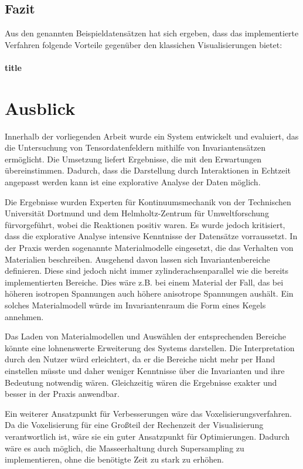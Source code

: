 \documentclass[a4paper,fontsize=12pt,toc=bib,halfparskip]{scrartcl}
\begin{document}
\subsection{Fazit}
Aus den genannten Beispieldatens\"atzen hat sich ergeben, dass das implementierte Verfahren folgende Vorteile gegen\"uber den klassichen Visualisierungen bietet:

\paragraph{title}



\section{Ausblick}
\label{sec:Ausblick}
Innerhalb der vorliegenden Arbeit wurde ein System entwickelt und evaluiert, das die Untersuchung von Tensordatenfeldern mithilfe von Invariantens\"atzen erm\"oglicht. Die Umsetzung liefert Ergebnisse, die mit den Erwartungen \"ubereinstimmen. Dadurch, dass die Darstellung durch Interaktionen in Echtzeit angepasst werden kann ist eine explorative Analyse der Daten m\"oglich. 

Die Ergebnisse wurden Experten f\"ur Kontinuumsmechanik von der Technischen Universit\"at Dortmund und dem Helmholtz-Zentrum für Umweltforschung f\"urvorgef\"uhrt, wobei die Reaktionen positiv waren. Es wurde jedoch kritisiert, dass die explorative Analyse intensive Kenntnisse der Datens\"atze vorraussetzt. In der Praxis werden sogenannte Materialmodelle eingesetzt, die das Verhalten von Materialien beschreiben. Ausgehend davon lassen sich Invariantenbereiche definieren. Diese sind jedoch nicht immer zylinderachsenparallel wie die bereits implementierten Bereiche. Dies w\"are z.B. bei einem Material der Fall, das bei h\"oheren isotropen Spannungen auch h\"ohere anisotrope Spannungen aush\"alt. Ein solches Materialmodell w\"urde im Invariantenraum die Form eines Kegels annehmen. 

Das Laden von Materialmodellen und Ausw\"ahlen der entsprechenden Bereiche k\"onnte eine lohnenswerte Erweiterung des Systems darstellen. Die Interpretation durch den Nutzer w\"urd erleichtert, da er die Bereiche nicht mehr per Hand einstellen m\"usste und daher weniger Kenntnisse \"uber die Invarianten und ihre Bedeutung notwendig w\"aren. Gleichzeitig w\"aren die Ergebnisse exakter und besser in der Praxis anwendbar. 

Ein weiterer Ansatzpunkt f\"ur Verbesserungen w\"are das Voxelisierungsverfahren. Da die Voxelisierung f\"ur eine Gro{\ss}teil der Rechenzeit der Visualisierung verantwortlich ist, w\"are sie ein guter Ansatzpunkt f\"ur Optimierungen. Dadurch w\"are es auch m\"oglich, die Masseerhaltung durch Supersampling zu implementieren, ohne die ben\"otigte Zeit zu stark zu erh\"ohen.
 
\end{document}
